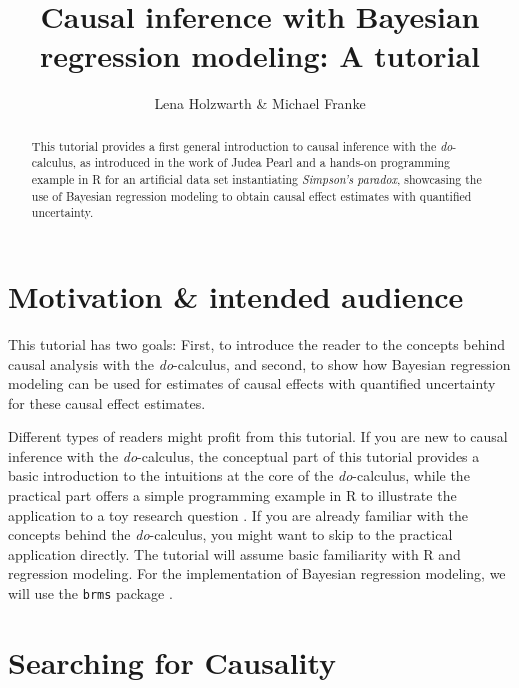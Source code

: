 \documentclass[nobib]{tufte-handout}
\title{Causal inference with Bayesian regression modeling: A tutorial}
\author{Lena Holzwarth \& Michael Franke}
\date{}
\newcommand{\docalc}{\emph{do}-calculus\xspace}
\begin{document}
\maketitle

\begin{abstract}
\noindent 
This tutorial provides a first general introduction to causal inference with the \docalc, as introduced in the work of Judea Pearl and a hands-on programming example in R for an artificial data set instantiating \emph{Simpson's paradox}, showcasing the use of Bayesian regression modeling to obtain causal effect estimates with quantified uncertainty.
\end{abstract}

\section{Motivation \& intended audience}

This tutorial has two goals: First, to introduce the reader to the concepts behind causal analysis with the \docalc \citep{pearl2000models}, and second, to show how Bayesian regression modeling can be used for estimates of causal effects with quantified uncertainty for these causal effect estimates.

Different types of readers might profit from this tutorial.
If you are new to causal inference with the \docalc, the conceptual part of this tutorial provides a basic introduction to the intuitions at the core of the \docalc, while the practical part offers a simple programming example in R to illustrate the application to a toy research question \citep{R}. 
If you are already familiar with the concepts behind the \docalc, you might want to skip to the practical application directly. 
The tutorial will assume basic familiarity with R and regression modeling. 
For the implementation of Bayesian regression modeling, we will use the \texttt{brms} package \citep{brms}.

\section{Searching for Causality}
\end{document}
